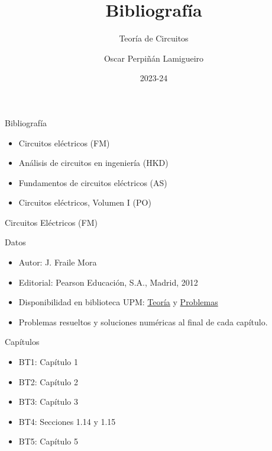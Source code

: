\documentclass[aspectratio=169, usenames,svgnames,dvipsnames]{beamer}
\author{Oscar Perpiñán Lamigueiro}
\date{2023-24}
\title{Bibliografía}
\subtitle{Teoría de Circuitos}
\begin{document}
\maketitle


\begin{frame}[label={sec:orge9de42f}]{Bibliografía}
\begin{itemize}
\item Circuitos eléctricos (\alert{FM})
\item Análisis de circuitos en ingeniería (\alert{HKD})
\item Fundamentos de circuitos eléctricos (\alert{AS})
\item Circuitos eléctricos, Volumen I (\alert{PO})
\end{itemize}
\end{frame}


\begin{frame}[label={sec:org42e6303}]{Circuitos Eléctricos (\alert{FM})}
\begin{block}{Datos}
\begin{itemize}
\item Autor: J. Fraile Mora
\item Editorial: Pearson Educación, S.A., Madrid, 2012
\item Disponibilidad en biblioteca UPM: \href{https://ingenio.upm.es/primo-explore/fulldisplay?docid=34UPM\_ALMA2150534070004212\&context=L\&vid=34UPM\_VU1\&search\_scope=TAB1\_SCOPE1\&tab=tab1\&lang=es\_ES}{Teoría} y \href{https://ingenio.upm.es/permalink/f/1vo0cl5/34UPM\_ALMA2164586310004212}{Problemas}
\item Problemas resueltos y soluciones numéricas al final de cada capítulo.
\end{itemize}
\end{block}

\begin{block}{Capítulos}
\begin{itemize}
\item BT1: Capítulo 1
\item BT2: Capítulo 2
\item BT3: Capítulo 3
\item BT4: Secciones 1.14 y 1.15
\item BT5: Capítulo 5
\end{itemize}
\end{block}
\end{frame}
\end{document}
